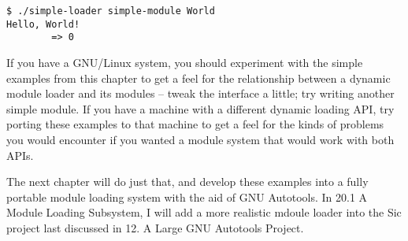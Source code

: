 \begin{Verbatim}[frame=single]
$ ./simple-loader simple-module World
Hello, World!
        => 0
\end{Verbatim}

If you have a GNU/Linux system, you should experiment with the simple examples from this chapter to get a feel for the relationship between a dynamic module loader and its modules -- tweak the interface a little; try writing another simple module. If you have a machine with a different dynamic loading API, try porting these examples to that machine to get a feel for the kinds of problems you would encounter if you wanted a module system that would work with both APIs.

The next chapter will do just that, and develop these examples into a fully portable module loading system with the aid of GNU Autotools. In 20.1 A Module Loading Subsystem, I will add a more realistic mdoule loader into the Sic project last discussed in 12. A Large GNU Autotools Project. 


